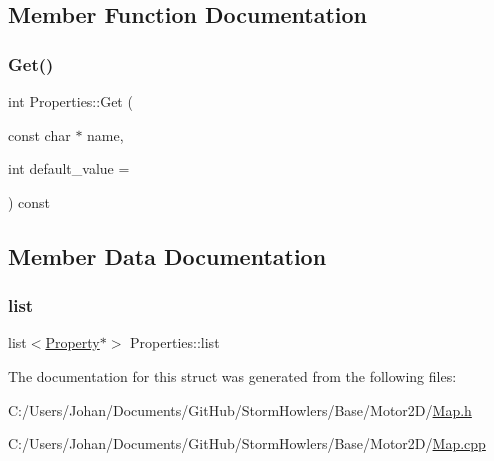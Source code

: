 \subsection{Member Function Documentation}
\mbox{\label{struct_properties_a728de312aae2d40ef5af5ac892965483}} 
\subsubsection{\texorpdfstring{Get()}{Get()}}
{\footnotesize\ttfamily int Properties\+::\+Get (\begin{DoxyParamCaption}\item[{const char $\ast$}]{name,  }\item[{int}]{default\+\_\+value = {} }\end{DoxyParamCaption}) const}



\subsection{Member Data Documentation}
\mbox{\label{struct_properties_af9cad6a48a10663603d73e01cf9fb5df}} 
\subsubsection{\texorpdfstring{list}{list}}
{\footnotesize\ttfamily list$<$\mbox{\hyperlink{struct_properties_1_1_property}{Property}}$\ast$$>$ Properties\+::list}



The documentation for this struct was generated from the following files\+:\begin{DoxyCompactItemize}
\item 
C\+:/\+Users/\+Johan/\+Documents/\+Git\+Hub/\+Storm\+Howlers/\+Base/\+Motor2\+D/\mbox{\hyperlink{_map_8h}{Map.\+h}}\item 
C\+:/\+Users/\+Johan/\+Documents/\+Git\+Hub/\+Storm\+Howlers/\+Base/\+Motor2\+D/\mbox{\hyperlink{_map_8cpp}{Map.\+cpp}}\end{DoxyCompactItemize}
